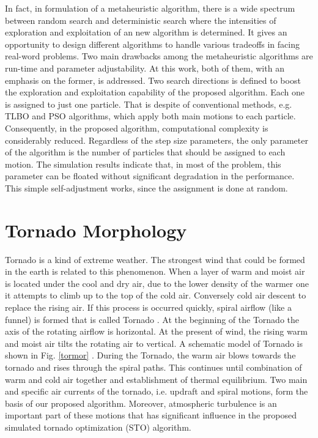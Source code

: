 \documentclass[conference]{IEEEtran}
\begin{document}
In fact, in formulation of a metaheuristic algorithm, there is a wide spectrum between random search and deterministic search where the intensities of exploration and exploitation of an new algorithm is determined. It gives an opportunity to design different algorithms to handle various tradeoffs in facing real-word problems. Two main drawbacks among the metaheuristic algorithms are run-time and parameter adjustability. At this work, both of them, with an emphasis on the former, is addressed. Two search directions is defined to boost the exploration and exploitation capability of the proposed algorithm. Each one is assigned to just one particle. That is despite of conventional methods, e.g. TLBO and PSO algorithms, which apply both main motions to each particle. Consequently, in the proposed algorithm, computational complexity is considerably reduced. Regardless of the step size parameters, the only parameter of the algorithm is the number of particles that should be assigned to each motion. The simulation results indicate that, in most of the problem, this parameter can be floated without significant degradation in the performance. This simple self-adjustment works, since the assignment is done at random.


\IEEEpubidadjcol

\section{Tornado Morphology}

Tornado is a kind of extreme weather. The strongest wind that could be formed in the earth is related to this phenomenon. When a layer of warm and moist air is located under the cool and dry air, due to the lower density of the warmer one it attempts to climb up to the top of the cold air. Conversely cold air descent to replace the rising air. If this process is occurred quickly, spiral airflow (like a funnel) is formed that is called Tornado \cite{tornado15}. At the beginning of the Tornado the axis of the rotating airflow is horizontal. At the present of wind, the rising warm and moist air tilts the rotating air to vertical. A schematic model of Tornado is shown in Fig. \ref{tormor} \cite{thunder16}. During the Tornado, the warm air blows towards the tornado and rises through the spiral paths. This continues until combination of warm and cold air together and establishment of thermal equilibrium. Two main and specific air currents of the tornado, i.e. updraft and spiral motions, form the basis of our proposed algorithm. Moreover, atmospheric turbulence is an important part of these motions that has significant influence in the proposed simulated tornado optimization (STO) algorithm.
\end{document}
